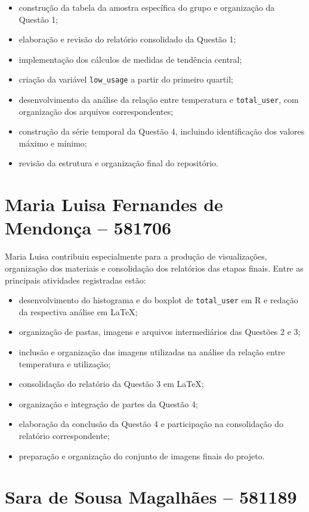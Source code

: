 \documentclass[12pt,oneside,a4paper,english,brazil]{abntex2}
\begin{document}
\begin{itemize}[leftmargin=1.2cm]
\item construção da tabela da amostra específica do grupo e organização da Questão 1;
\item elaboração e revisão do relatório consolidado da Questão 1;
\item implementação dos cálculos de medidas de tendência central;
\item criação da variável \texttt{low\_usage} a partir do primeiro quartil;
\item desenvolvimento da análise da relação entre temperatura e \texttt{total\_user}, com organização dos arquivos correspondentes;
\item construção da série temporal da Questão 4, incluindo identificação dos valores máximo e mínimo;
\item revisão da estrutura e organização final do repositório.
\end{itemize}

\section{Maria Luisa Fernandes de Mendonça -- 581706}

Maria Luisa contribuiu especialmente para a produção de visualizações, organização dos materiais e consolidação dos relatórios das etapas finais. Entre as principais atividades registradas estão:

\begin{itemize}[leftmargin=1.2cm]
\item desenvolvimento do histograma e do boxplot de \texttt{total\_user} em R e redação da respectiva análise em LaTeX;
\item organização de pastas, imagens e arquivos intermediários das Questões 2 e 3;
\item inclusão e organização das imagens utilizadas na análise da relação entre temperatura e utilização;
\item consolidação do relatório da Questão 3 em LaTeX;
\item organização e integração de partes da Questão 4;
\item elaboração da conclusão da Questão 4 e participação na consolidação do relatório correspondente;
\item preparação e organização do conjunto de imagens finais do projeto.
\end{itemize}

\section{Sara de Sousa Magalhães -- 581189}
\end{document}
